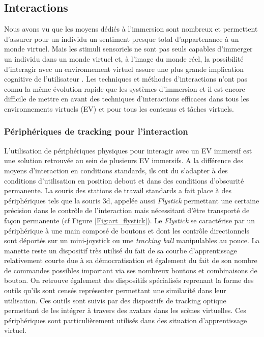 \subsection{Interactions}

Nous avons vu que les moyens dédiés à l'immersion sont nombreux et permettent d'assurer pour un individu un sentiment presque total d'appartenance à un monde virtuel.
Mais les stimuli sensoriels ne sont pas seuls capables d'immerger un individu dans un monde virtuel et, à l'image du monde réel, la possibilité d'interagir avec un environnement virtuel assure une plus grande implication cognitive de l'utilisateur \cite{steuer1995defining}. Les techniques et méthodes d'interactions n'ont pas connu la même évolution rapide que les systèmes d'immersion et il est encore difficile de mettre en avant des techniques d'interactions efficaces dans tous les environnements virtuels (EV) et pour tous les contenus et tâches virtuels.

\subsubsection{Périphériques de tracking pour l'interaction} \label{peripheriques}

L'utilisation de périphériques physiques pour interagir avec un EV immersif est une solution retrouvée au sein de plusieurs EV immersifs. A la différence des moyens d'interaction en conditions standards, ils ont du s'adapter à des conditions d'utilisation en position debout et dans des conditions d'obscurité permanente. La souris des stations de travail standards a fait place à des périphériques tels que la souris 3d, appelée aussi \textit{Flystick} permettant une certaine précision dans le contrôle de l'interaction mais nécessitant d'être transporté de façon permanente (cf Figure \ref{Fig:art_flystick}). Le \textit{Flystick} se caractérise par un périphérique à une main composé de boutons et dont les contrôle directionnels sont déportés sur un mini-joystick ou une \textit{tracking ball} manipulables au pouce. La manette reste un dispositif très utilisé du fait de sa courbe d'apprentissage relativement courte due à sa démocratisation et également du fait de son nombre de commandes possibles important via ses nombreux boutons et combinaisons de bouton.
On retrouve également des dispositifs spécialisés reprenant la forme des outils qu'ils sont censés représenter permettant une similarité dans leur utilisation. Ces outils sont suivis par des dispositifs de tracking optique permettant de les intégrer à travers des avatars dans les scènes virtuelles. Ces périphériques sont particulièrement utilisés dans des situation d'apprentissage virtuel.

